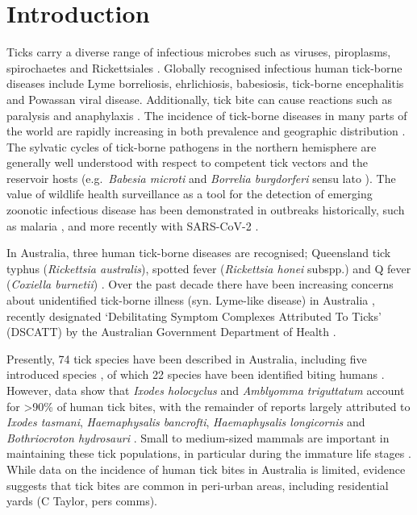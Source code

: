 \documentclass[a4paper, nobind]{templates/ociamthesis}
\begin{document}
\hypertarget{introduction-1}{%
\section{Introduction}\label{introduction-1}}

Ticks carry a diverse range of infectious microbes such as viruses, piroplasms, spirochaetes and Rickettsiales \autocite{pfaffleEcologyTickborneDiseases2013}.
Globally recognised infectious human tick-borne diseases include Lyme borreliosis, ehrlichiosis, babesiosis, tick-borne encephalitis and Powassan viral disease.
Additionally, tick bite can cause reactions such as paralysis and anaphylaxis \autocite{vannunenAssociationTickBite2009}.
The incidence of tick-borne diseases in many parts of the world are rapidly increasing in both prevalence and geographic distribution \autocite{madison-antenucciEmergingTickBorneDiseases2020}.
The sylvatic cycles of tick-borne pathogens in the northern hemisphere are generally well understood with respect to competent tick vectors and the reservoir hosts (e.g.~\emph{Babesia microti} \autocite{westbladeBabesiaMicrotiMice2017} and \emph{Borrelia burgdorferi} sensu lato \autocite{radolfTicksMiceMen2012}).
The value of wildlife health surveillance as a tool for the detection of emerging zoonotic infectious disease has been demonstrated in outbreaks historically, such as malaria \autocite{rondonPrevalencePlasmodiumParasites2019}, and more recently with SARS-CoV-2 \autocite{plowrightLandUseinducedSpillover2021}.

In Australia, three human tick-borne diseases are recognised; Queensland tick typhus (\emph{Rickettsia australis}), spotted fever (\emph{Rickettsia honei} subspp.) and Q fever (\emph{Coxiella burnetii}) \autocite{gravesTickborneInfectiousDiseases2017}.
Over the past decade there have been increasing concerns about unidentified tick-borne illness (syn. Lyme-like disease) in Australia \autocite{chaladaThereLymelikeDisease2016}, recently designated `Debilitating Symptom Complexes Attributed To Ticks' (DSCATT) by the Australian Government Department of Health \autocite{radcliffeGrowingEvidenceEmerging2016}.

Presently, 74 tick species have been described in Australia, including five introduced species \autocite{barkerIxodesBarkeriSp2019,evansAutomaticBarcodeGap2019}, of which 22 species have been identified biting humans \autocite{kwakFirstRecordsHuman2018}.
However, data show that \emph{Ixodes holocyclus} and \emph{Amblyomma triguttatum} account for \textgreater90\% of human tick bites, with the remainder of reports largely attributed to \emph{Ixodes tasmani}, \emph{Haemaphysalis bancrofti}, \emph{Haemaphysalis longicornis} and \emph{Bothriocroton hydrosauri} \autocite{kwakFirstRecordsHuman2018}.
Small to medium-sized mammals are important in maintaining these tick populations, in particular during the immature life stages \autocite{murdochEcologyCommonMarsupial2005,lydeckerPeriurbanBlackRats2019,taylorInvasiveRabbitsHost2020}.
While data on the incidence of human tick bites in Australia is limited, evidence suggests that tick bites are common in peri-urban areas, including residential yards (C Taylor, pers comms).
\end{document}

